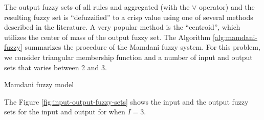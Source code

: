 \documentclass[english]{sobraep}
\begin{document}
The output fuzzy sets of all rules and aggregated (with the \(\vee\) operator) and the resulting fuzzy set is ``defuzzified'' to a crisp value using one of several methods described in the literature. A very popular method is the ``centroid'', which utilizes the center of mass of the output fuzzy set. The Algorithm \ref{alg:mamdani-fuzzy} summarizes the procedure of the Mamdani fuzzy system. For this problem, we consider triangular membership function and a number of input and output sets that varies between 2 and 3.

\begin{algorithm}[!ht]
    \DontPrintSemicolon
      
    
    \caption{Mamdani fuzzy model}
    \label{alg:mamdani-fuzzy}
\end{algorithm}

The Figure \ref{fig:input-output-fuzzy-sets} shows the input and the output fuzzy sets for the input and output for when \(I=3\).
\end{document}
